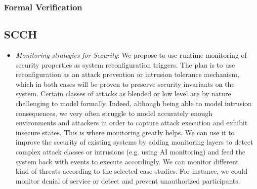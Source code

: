 \documentclass[a4paper,11pt]{article}
\begin{document}
\subsubsection{Formal Verification}

\subsection{SCCH}
\begin{itemize}
\item \emph{Monitoring strategies for Security}: We propose to use runtime monitoring of security properties as system reconfiguration triggers. The plan is to use reconfiguration as an attack prevention or intrusion tolerance mechanism, which in both cases will be proven to preserve security invariants on the system. Certain classes of attacks as blended or low level are by nature challenging to model formally. Indeed, although being able to model intrusion consequences, we very often struggle to model accurately enough environments and attackers in order to capture attack execution and exhibit insecure states. This is where monitoring greatly helps. We can use it to improve the security of existing systems by adding monitoring layers to detect complex attack classes or intrusions (e.g. using AI monitoring) and feed the system back with events to execute accordingly. We can monitor different kind of threats according to the selected case studies. For instance, we could monitor denial of service or detect and prevent unauthorized participants.


\end{itemize}
\end{document}
